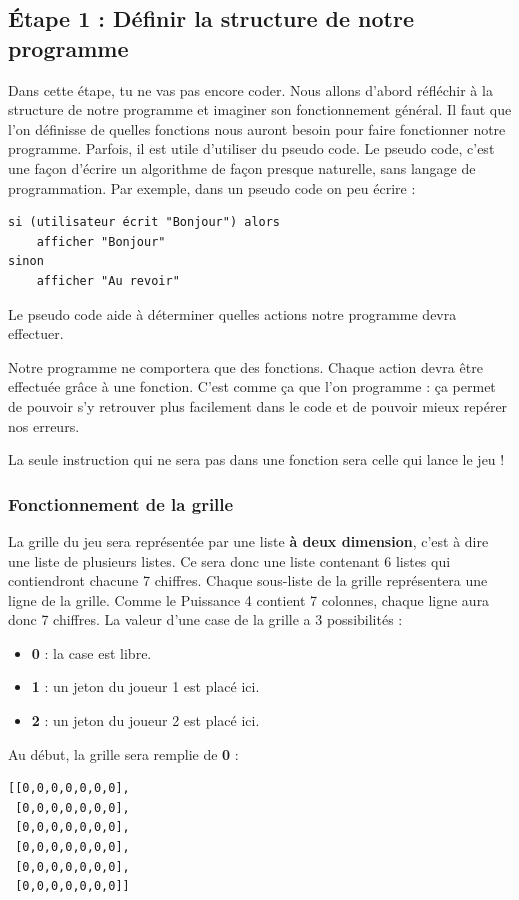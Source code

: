 \documentclass[11pt]{article}
\begin{document}
\subsection*{Étape 1 : Définir la structure de notre programme}
\label{puissance4_etape1}
Dans cette étape, tu ne vas pas encore coder. Nous allons d'abord réfléchir à la structure de notre programme et imaginer son fonctionnement général. Il faut que l'on définisse de quelles fonctions nous auront besoin pour faire fonctionner notre programme.
Parfois, il est utile d'utiliser du \og pseudo code\fg{}. Le pseudo code, c'est une façon d'écrire un algorithme de façon presque naturelle, sans langage de programmation. Par exemple, dans un pseudo code on peu écrire :
\begin{verbatim}
si (utilisateur écrit "Bonjour") alors
    afficher "Bonjour"
sinon
    afficher "Au revoir"
\end{verbatim}
Le pseudo code aide à déterminer quelles actions notre programme devra effectuer.

Notre programme ne comportera que des fonctions. Chaque action devra être effectuée grâce à une fonction. C'est comme ça que l'on programme : ça permet de pouvoir s'y retrouver plus facilement dans le code et de pouvoir mieux repérer nos erreurs.

La seule instruction qui ne sera pas dans une fonction sera celle qui lance le jeu !

\subsubsection*{Fonctionnement de la grille}
\label{sec:orgc471b5b}
La \og grille\fg{} du jeu sera représentée par une liste \textbf{à deux dimension}, c'est à dire une liste de plusieurs listes. Ce sera donc une liste contenant 6 listes qui contiendront chacune 7 chiffres. Chaque sous-liste de la grille représentera une ligne de la grille. Comme le Puissance 4 contient 7 colonnes, chaque ligne aura donc 7 chiffres. La valeur d'une case de la grille a 3 possibilités :
\begin{itemize}
\item \textbf{0} : la case est libre.
\item \textbf{1} : un jeton du joueur 1 est placé ici.
\item \textbf{2} : un jeton du joueur 2 est placé ici.
\end{itemize}

Au début, la grille sera remplie de \textbf{0} :
\begin{verbatim}
[[0,0,0,0,0,0,0],
 [0,0,0,0,0,0,0],
 [0,0,0,0,0,0,0],
 [0,0,0,0,0,0,0],
 [0,0,0,0,0,0,0],
 [0,0,0,0,0,0,0]]
\end{verbatim}
\end{document}
